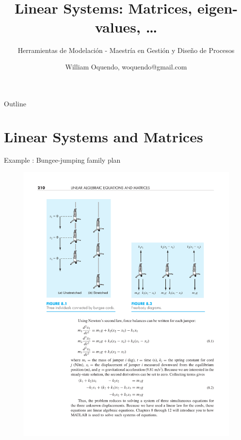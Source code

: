 \documentclass[xcolor=svgnames,t,10pt,allowframebreaks]{beamer}
\author{William Oquendo, woquendo@gmail.com}
\date{}
\title{Linear Systems: Matrices, eigen-values, \ldots{}}
\subtitle{Herramientas de Modelación - Maestría en Gestión y Diseño de Procesos}
\begin{document}
\maketitle
\begin{frame}{Outline}
\tableofcontents
\end{frame}


\section{Linear Systems and Matrices}
\label{sec:org8240dae}
\begin{frame}[label={sec:org9eec588}]{Example : Bungee-jumping family plan \cite{chapra2012AppliedNumericalMethods}}
\vfill
\begin{center}
\begin{figure}[H]

\includegraphics[width=1.0\textwidth]{fig/bungee-family-01.pdf}
\end{figure}
\end{center}
\vfill
\end{frame}
\end{document}
